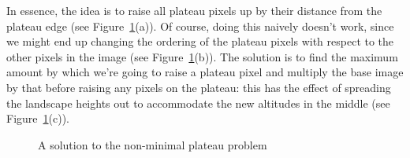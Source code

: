 In essence, the idea is to raise all plateau pixels up by their distance from the plateau edge (see Figure~\ref{fig:segmentation-watershed-plateau}(a)). Of course, doing this naively doesn't work, since we might end up changing the ordering of the plateau pixels with respect to the other pixels in the image (see Figure~\ref{fig:segmentation-watershed-plateau}(b)). The solution is to find the maximum amount by which we're going to raise a plateau pixel and multiply the base image by that before raising any pixels on the plateau: this has the effect of spreading the landscape heights out to accommodate the new altitudes in the middle (see Figure~\ref{fig:segmentation-watershed-plateau}(c)).

\begin{figure}[t]
\begin{center}
	\hspace{4mm}%
	\hspace{4mm}%
\end{center}
\caption{A solution to the non-minimal plateau problem}
\label{fig:segmentation-watershed-plateau}
\end{figure}

